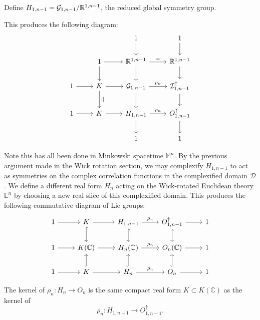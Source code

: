 \documentclass[a4paper,11pt]{article}
\begin{document}
\begin{definition}
    Define $H_{1,n-1} = \mathcal{G}_{1,n-1}/\mathbb{R}^{1,n-1}$, the reduced global symmetry group.
\end{definition}
This produces the following diagram:
\begin{equation*}
\begin{tikzcd}
	&& 1 & 1 \\
	& 1 & {\R^{1,n-1}} & {\R^{1,n-1}} \\
	1 & K & {\mathcal{G}_{1,n-1}} & {{\mathcal I}^{\uparrow}_{1,n-1}} \\
	1 & K & {H_{1,n-1}} & {O^{\uparrow}_{1,n-1}} \\
	&& 1 & 1
	\arrow[from=1-3, to=2-3]
	\arrow[from=1-4, to=2-4]
	\arrow[from=2-2, to=2-3]
	\arrow[from=2-2, to=3-2]
	\arrow["{=}", from=2-3, to=2-4]
	\arrow[from=2-3, to=3-3]
	\arrow[from=2-4, to=3-4]
	\arrow[from=3-1, to=3-2]
	\arrow[from=3-2, to=3-3]
	\arrow["{||}", from=3-2, to=4-2]
	\arrow["{\rho_n}", from=3-3, to=3-4]
	\arrow[from=3-3, to=4-3]
	\arrow[from=3-4, to=4-4]
	\arrow[from=4-1, to=4-2]
	\arrow[from=4-2, to=4-3]
	\arrow["{\rho_n}", from=4-3, to=4-4]
	\arrow[from=4-3, to=5-3]
	\arrow[from=4-4, to=5-4]
\end{tikzcd}
\end{equation*}

Note this has all been done in Minkowski spacetime $\mathbb{M}^n$. By the previous argument made in the Wick rotation section, we may complexify $H_{1,n-1}$ to act as symmetries on the complex correlation functions in the complexified domain $\mathcal{D}$. We define a different real form $H_n$ acting on the Wick-rotated Euclidean theory $\mathbb{E}^n$ by choosing a new real slice of this complexified domain. This produces the following commutative diagram of Lie groups: 
\[
\begin{tikzcd}
1 \arrow[r] & K \arrow[r] \arrow[d,hook] &
H_{1,n-1} \arrow[r, "\rho_n"] \arrow[d,hook] &
O^\uparrow_{1,n-1} \arrow[r] \arrow[d,hook] &  1\\
1 \arrow[r] & K(\mathbb C) \arrow[r]  &
H_n(\mathbb C) \arrow[r, "\rho_n"]  &
O_n(\mathbb C) \arrow[r] & 1 \\
1 \arrow[r] & K \arrow[r] \arrow[u,hook]&
H_n \arrow[r, "\rho_n"] \arrow[u,hook] &
O_n \arrow[r] \arrow[u,hook] & 1
\end{tikzcd}
\]

\begin{remark}
    The kernel of $\rho_n:H_n\longrightarrow O_n$ is the same compact real form $K\subset K(\mathbb C)$ as the kernel of
    \[
        \rho_n:H_{1,n-1}\longrightarrow O^\uparrow_{1,n-1}.
    \]
\end{remark}
\end{document}
